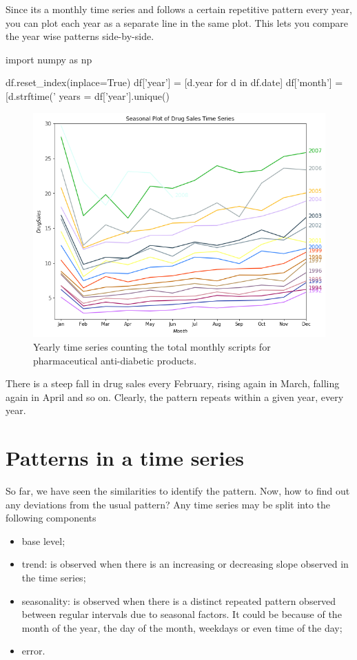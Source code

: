 Since its a monthly time series and follows a certain repetitive pattern
every year, you can plot each year as a separate line in the same plot.
This lets you compare the year wise patterns side-by-side.

\begin{ipython}
import numpy as np

df.reset_index(inplace=True)
df['year'] = [d.year for d in df.date]
df['month'] = [d.strftime('%
years = df['year'].unique()
\end{ipython}

\begin{figure}[htb]
	\centering
	\includegraphics[width=0.7\linewidth]{figures/yearly_drug_dataset.png}
	\caption{Yearly time series counting the total monthly scripts for pharmaceutical anti-diabetic products.}
	\label{fig:yearly_drug_dataset}
\end{figure}
    
There is a steep fall in drug sales every February, rising again in
March, falling again in April and so on. Clearly, the pattern repeats
within a given year, every year.

\section{Patterns in a time series}\label{patterns-in-a-time-series}

So far, we have seen the similarities to identify the pattern. Now, how
to find out any deviations from the usual pattern? Any time series may
be split into the following components

\begin{itemize}
\tightlist
\item
  base level;
\item
  trend: is observed when there is an increasing or decreasing slope
  observed in the time series;
\item
  seasonality: is observed when there is a distinct repeated pattern
  observed between regular intervals due to seasonal factors. It could
  be because of the month of the year, the day of the month, weekdays or
  even time of the day;
\item
  error.
\end{itemize}

